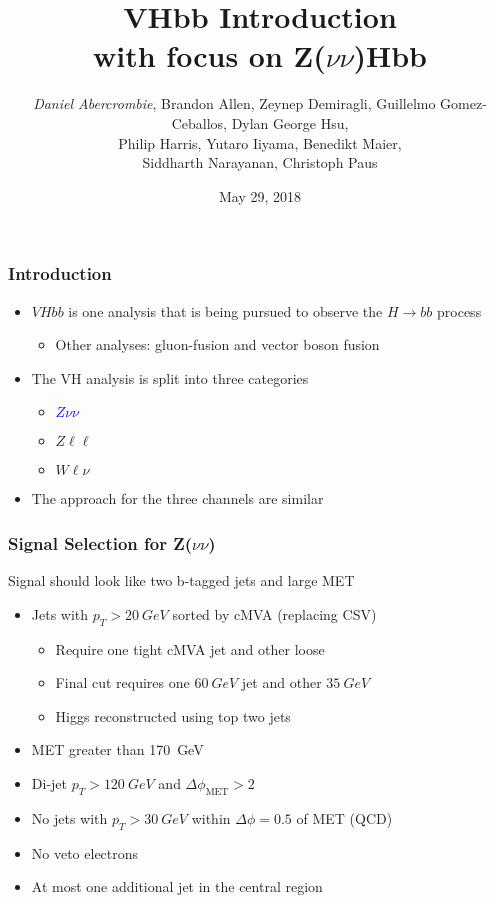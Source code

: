 \documentclass{beamer}
\author[D. Abercrombie]{
  \emph{Daniel Abercrombie}, Brandon Allen, Zeynep Demiragli,
  Guillelmo Gomez-Ceballos, Dylan George Hsu, \\
  Philip Harris, Yutaro Iiyama, Benedikt Maier, \\
  Siddharth Narayanan, Christoph Paus
}
\title{\bf \sffamily VHbb Introduction \\ with focus on Z($\nu\nu$)Hbb}
\date{May 29, 2018}
\begin{document}
\begin{frame}[nonumbering]
  \titlepage
\end{frame}

\begin{frame}
  \frametitle{Introduction}
  \begin{itemize}
  \item $VHbb$ is one analysis that is being pursued to observe the $H \rightarrow bb$ process
    \begin{itemize}
    \item Other analyses: gluon-fusion and vector boson fusion
    \end{itemize}
  \item The VH analysis is split into three categories
    \begin{itemize}
    \item \textcolor{blue}{$Z\nu\nu$}
    \item $Z\ell\ell$
    \item $W\ell\nu$
    \end{itemize}
  \item The approach for the three channels are similar
  \end{itemize}
\end{frame}

\begin{frame}
  \frametitle{Signal Selection for Z($\nu\nu$)}
  Signal should look like two b-tagged jets and large MET
  \begin{itemize}
  \item Jets with $p_T > \SI{20}{GeV}$ sorted by cMVA (replacing CSV)
    \begin{itemize}
    \item Require one tight cMVA jet and other loose
    \item Final cut requires one $\SI{60}{GeV}$ jet and other $\SI{35}{GeV}$
    \item Higgs reconstructed using top two jets
    \end{itemize}
  \item MET greater than \SI{170}{GeV}
  \item Di-jet $p_T > \SI{120}{GeV}$ and $\Delta\phi_{\mathrm{MET}} > 2$
  \item No jets with $p_T > \SI{30}{GeV}$ within $\Delta\phi = 0.5$ of MET (QCD)
  \item No veto electrons
  \item At most one additional jet in the central region
  \end{itemize}
\end{frame}
\end{document}
